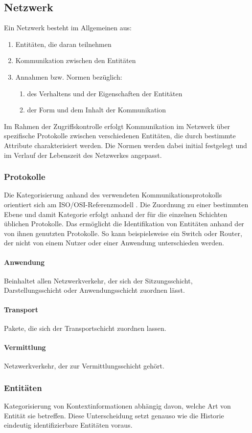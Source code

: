 \subsection{Netzwerk}
Ein Netzwerk besteht im Allgemeinen aus:
\begin{enumerate}
\item{Entitäten, die daran teilnehmen}
\item{Kommunikation zwischen den Entitäten}
\item{Annahmen bzw. Normen bezüglich:}
\begin{enumerate}
	\item{des Verhaltens und der Eigenschaften der Entitäten}
	\item{der Form und dem Inhalt der Kommunikation}
\end{enumerate}
\end{enumerate}
Im Rahmen der Zugriffskontrolle erfolgt Kommunikation im Netzwerk über spezifische Protokolle zwischen verschiedenen Entitäten, die durch bestimmte Attribute charakterisiert werden. Die Normen werden dabei initial festgelegt und im Verlauf der Lebenszeit des Netzwerkes angepasst.
\subsubsection{Protokolle}
Die Kategorisierung anhand des verwendeten Kommunikationsprotokolls orientiert sich am ISO/OSI-Referenzmodell \cite{day1983osi}. Die Zuordnung zu einer bestimmten Ebene und damit Kategorie erfolgt anhand der für die einzelnen Schichten üblichen Protokolle. Das ermöglicht die Identifikation von Entitäten anhand der von ihnen genutzten Protokolle. So kann beispielsweise ein Switch oder Router, der nicht von einem Nutzer oder einer Anwendung unterschieden werden.
\paragraph{Anwendung}
Beinhaltet allen Netzwerkverkehr, der sich der Sitzungsschicht, Darstellungsschicht oder Anwendungsschicht zuordnen lässt. 
\paragraph{Transport}
Pakete, die sich der Transportschicht zuordnen lassen.
\paragraph{Vermittlung}
Netzwerkverkehr, der zur Vermittlungsschicht gehört.
\subsubsection{Entitäten}
Kategorisierung von Kontextinformationen abhängig davon, welche Art von Entität sie betreffen.
Diese Unterscheidung setzt genauso wie die Historie eindeutig identifizierbare Entitäten voraus.
